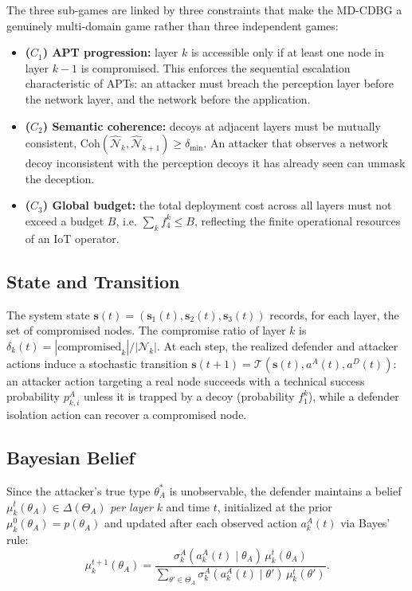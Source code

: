 \documentclass[conference]{IEEEtran}
\newcommand{\Coh}{\mathrm{Coh}}
\begin{document}
The three sub-games are linked by three constraints that make the MD-CDBG a
genuinely multi-domain game rather than three independent games:
\begin{itemize}
\item \textbf{($C_1$) APT progression:} layer $k$ is accessible only if at
least one node in layer $k-1$ is compromised. This enforces the sequential
escalation characteristic of APTs: an attacker must breach the perception layer
before the network layer, and the network before the application.
\item \textbf{($C_2$) Semantic coherence:} decoys at adjacent layers must be
mutually consistent, $\Coh(\hat{\mathcal{N}}_k,\hat{\mathcal{N}}_{k+1}) \geq
\delta_{\min}$. An attacker that observes a network decoy inconsistent with the
perception decoys it has already seen can unmask the deception.
\item \textbf{($C_3$) Global budget:} the total deployment cost across all
layers must not exceed a budget $B$, i.e. $\sum_k f_4^k \leq B$, reflecting the
finite operational resources of an IoT operator.
\end{itemize}

\subsection{State and Transition}

The system state $\mathbf{s}(t) = (\mathbf{s}_1(t), \mathbf{s}_2(t),
\mathbf{s}_3(t))$ records, for each layer, the set of compromised nodes. The
compromise ratio of layer $k$ is $\delta_k(t) = |\text{compromised}_k| /
|\mathcal{N}_k|$. At each step, the realized defender and attacker actions
induce a stochastic transition $\mathbf{s}(t{+}1) =
\mathcal{T}(\mathbf{s}(t), a^A(t), a^D(t))$: an attacker action targeting a real
node succeeds with a technical success probability $p_{k,i}^A$ unless it is
trapped by a decoy (probability $f_1^k$), while a defender isolation action can
recover a compromised node.

\subsection{Bayesian Belief}

Since the attacker's true type $\theta_A^*$ is unobservable, the defender
maintains a belief $\mu_k^t(\theta_A) \in \Delta(\Theta_A)$ \emph{per layer}
$k$ and time $t$, initialized at the prior $\mu_k^0(\theta_A) = p(\theta_A)$ and
updated after each observed action $a_k^A(t)$ via Bayes' rule:
\begin{equation}
\mu_k^{t+1}(\theta_A) =
\frac{\sigma_k^A(a_k^A(t)\mid\theta_A)\,\mu_k^t(\theta_A)}
{\sum_{\theta'\in\Theta_A}\sigma_k^A(a_k^A(t)\mid\theta')\,\mu_k^t(\theta')}.
\label{eq:bayes}
\end{equation}
\end{document}
